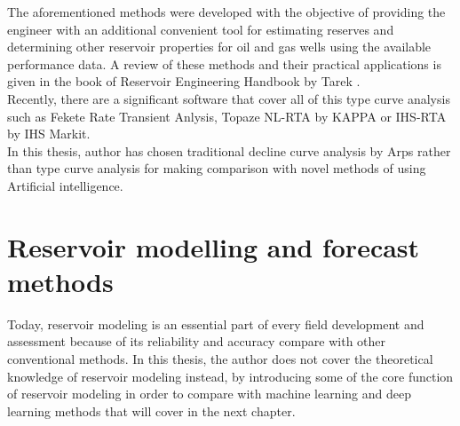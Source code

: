 \documentclass[12pt,a4paper]{report}
\begin{document}
The aforementioned methods were developed with the objective of providing the engineer with an additional convenient tool for estimating reserves and determining other reservoir properties for oil and gas wells using the available performance data. A review of these methods and their practical applications is given in the book of Reservoir Engineering Handbook by Tarek \cite{Tarek}.\\
Recently, there are a significant software that cover all of this type curve analysis such as  Fekete Rate Transient Anlysis, Topaze NL-RTA by KAPPA or IHS-RTA by IHS Markit.\\
In this thesis, author has chosen traditional decline curve analysis by Arps rather than type curve analysis for making comparison with novel methods of using Artificial intelligence.





\section{Reservoir modelling and forecast methods}
Today, reservoir modeling is an essential part of every field development and assessment because of its reliability and accuracy compare with other conventional methods. In this thesis, the author does not cover the theoretical knowledge of reservoir modeling instead, by introducing some of the core function of reservoir modeling in order to compare with machine learning and deep learning methods that will cover in the next chapter.
\end{document}
